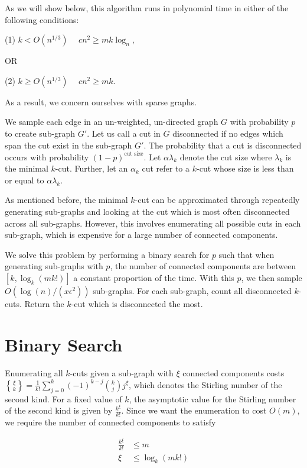 \documentclass{acm_proc_article-sp}
\DeclareRobustCommand{\stirling}{\genfrac\{\}{0pt}{}}
\begin{document}
As we will show below, this algorithm runs in polynomial time in either of the following conditions:

(1) $k < O(n^{1/3}) \hspace{15pt} cn^2 \geq mk \log_n$, 

OR

(2) $k \geq O(n^{1/3}) \hspace{15pt} cn^2 \geq mk$.

As a result, we concern ourselves with sparse graphs.

We sample each edge in an un-weighted, un-directed graph 
$G$ with probability $p$ to create sub-graph $G'$. Let us call a cut in $G$ disconnected if no edges which span the cut exist in the sub-graph $G'$. The probability that a cut is disconnected occurs with probability $(1-p)^{\text{cut size}}$. Let $\alpha \lambda_k$ denote the cut size where $\lambda_k$ is the minimal $k$-cut. Further, let an $\alpha_k$ cut refer to a $k$-cut whose size is less than or equal to $\alpha \lambda_k$.

As mentioned before, the minimal $k$-cut can be approximated through repeatedly generating sub-graphs and looking at the cut which is most often disconnected across all sub-graphs. However, this involves enumerating all possible cuts in each sub-graph, which is expensive for a large number of connected components. 

We solve this problem by performing a binary search for $p$ such that when generating sub-graphs with $p$, the number of connected components are between $[k, \log_k(m k!)]$ a constant proportion of the time. With this $p$, we then sample $O(\log(n)/(x\epsilon^2))$ sub-graphs. For each sub-graph, count all disconnected $k$-cuts. Return the $k$-cut which is disconnected the most.

\section{Binary Search} Enumerating all $k$-cuts given a sub-graph with $\xi$ connected components costs $ \stirling{\xi}{k} = \frac{1}{k!} \sum_{j=0}^k (-1)^{k-j} \binom{k}{j} j^\xi$, which denotes the Stirling number of the second kind. For a fixed value of $k$, the asymptotic value for the Stirling number of the second kind is given by $\frac{k^\xi}{k!}$. Since we want the enumeration to cost $O(m)$, we require the number of connected components to satisfy

\begin{align*}
\frac{k^\xi}{k!} &\leq m \\
\xi &\leq \log_k(m k!) 
\end{align*}
\end{document}
